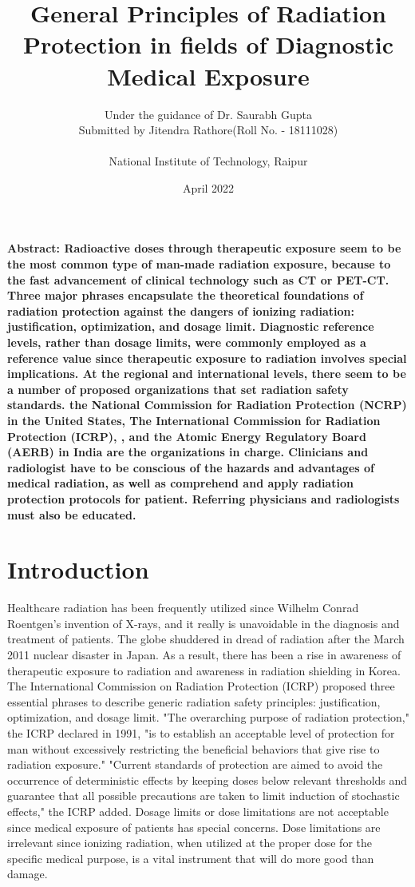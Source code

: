 \documentclass{article}
\title{\textbf{General Principles of Radiation Protection in fields of Diagnostic Medical Exposure}}
\author{Under the guidance of Dr. Saurabh Gupta\\
Submitted by Jitendra Rathore(Roll No. - 18111028) \\ \testit{Department of Biomedical Engineering} \\National Institute of Technology, Raipur }
\date{April 2022}
\begin{document}
\maketitle
\large
\begin{Abstract}\textbf{Abstract: Radioactive doses through therapeutic exposure seem to be the most common type of man-made radiation exposure, because to the fast advancement of clinical technology such as CT or PET-CT. Three major phrases encapsulate the theoretical foundations of radiation protection against the dangers of ionizing radiation: justification, optimization, and dosage limit. Diagnostic reference levels, rather than dosage limits, were commonly employed as a reference value since therapeutic exposure to radiation involves special implications. At the regional and international levels, there seem to be a number of proposed organizations that set radiation safety standards. the National Commission for Radiation Protection (NCRP) in the United States, The International Commission for Radiation Protection (ICRP), , and the Atomic Energy Regulatory Board (AERB) in India are the organizations in charge. Clinicians and radiologist have to be conscious of the hazards and advantages of medical radiation, as well as comprehend and apply radiation protection protocols for patient. Referring physicians and radiologists must also be educated.} 
\end{Abstract}
\section{Introduction}

Healthcare radiation has been frequently utilized since Wilhelm Conrad Roentgen's invention of X-rays, and it really is unavoidable in the diagnosis and treatment of patients. The globe shuddered in dread of radiation after the March 2011 nuclear disaster in Japan. As a result, there has been a rise in awareness of therapeutic exposure to radiation and awareness in radiation shielding in Korea. 
The International Commission on Radiation Protection (ICRP) proposed three essential phrases to describe generic radiation safety principles: justification, optimization, and dosage limit. "The overarching purpose of radiation protection," the ICRP declared in 1991, "is to establish an acceptable level of protection for man without excessively restricting the beneficial behaviors that give rise to radiation exposure." "Current standards of protection are aimed to avoid the occurrence of deterministic effects by keeping doses below relevant thresholds and guarantee that all possible precautions are taken to limit induction of stochastic effects," the ICRP added. Dosage limits or dose limitations are not acceptable since medical exposure of patients has special concerns. Dose limitations are irrelevant since ionizing radiation, when utilized at the proper dose for the specific medical purpose, is a vital instrument that will do more good than damage. \\
\end{document}
